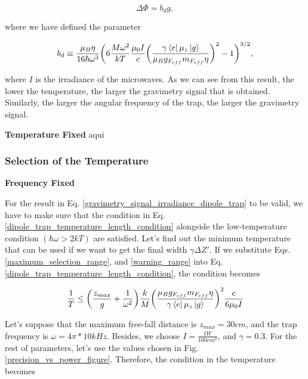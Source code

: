 \documentclass{article}
\begin{document}
\begin{equation}\label{gravimetry_signal_irradiance_dipole_trap}
    \Delta \Phi = b_{d} g, 
\end{equation}

where we have defined the parameter

\begin{equation}
    b_{d} \equiv \frac{\mu_{B} \eta}{16 \hbar \omega^{3}} \bigg(6 \frac{M \omega^{2}}{kT} \frac{\mu_{0} I}{c} \bigg(\frac{ \gamma  \bra{e} \mu_{z} \ket{g}}{\mu_{B} g_{F_{eff}} m_{F_{eff}} \eta}\bigg)^{2} - 1\bigg)^{3/2},
\end{equation}

where $I$ is the irradiance of the microwaves. As we can see from this result, the lower the temperature, the larger the gravimetry signal that is obtained. Similarly, the larger the angular frequency of the trap, the larger the gravimetry signal.

\vspace{5mm}
\textbf{Temperature Fixed}
aqui

\subsubsection{Selection of the Temperature}
\textbf{Frequency Fixed}

For the result in Eq. \ref{gravimetry_signal_irradiance_dipole_trap} to be valid, we have to make sure that the condition in Eq. \ref{dipole_trap_temperature_length_condition} alongside the low-temperature condition $(\hbar \omega > 2kT)$ are satisfied. Let's find out the minimum temperature that can be used if we want to get the final width $\gamma \Delta Z'$. If we substitute Eqs. \ref{maximum_selection_range}, and \ref{warning_range} into Eq. \ref{dipole_trap_temperature_length_condition}, the condition becomes

\begin{equation}
    \frac{1}{T} \le \bigg( \frac{z_{max}}{g} + \frac{1}{\omega^{2}} \bigg) \frac{k}{M} \bigg( \frac{\mu_{B} g_{F_{eff}} m_{F_{eff}} \eta}{\gamma  \bra{e} \mu_{z} \ket{g}} \bigg)^{2}  \frac{c}{6 \mu_{0} I}
\end{equation}

Let's suppose that the maximum free-fall distance is $z_{max}=30cm$, and the trap frequency is $\omega = 4\pi*10kHz$. Besides, we choose $I=\frac{1W}{100 cm^{2}}$, and $\gamma=0.3$.  For the rest of parameters, let's use the values chosen in Fig. \ref{precision_vs_power_figure}. Therefore, the condition in the temperature becomes
\end{document}
